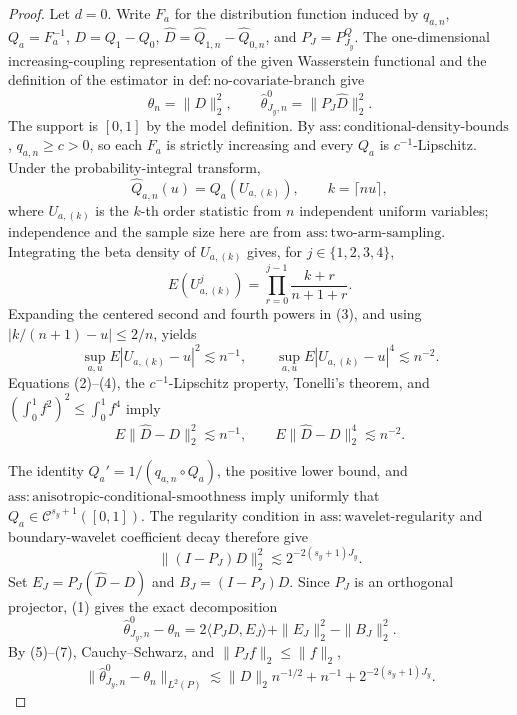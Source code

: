 \documentclass{article}
\begin{document}
\begin{proof}
Let \(d=0\). Write \(F_a\) for the distribution function induced by \(q_{a,n}\), \(Q_a=F_a^{-1}\), \(D=Q_1-Q_0\), \(\widehat D=\widehat Q_{1,n}-\widehat Q_{0,n}\), and \(P_J=P^Q_{J_y}\). The one-dimensional increasing-coupling representation of the given Wasserstein functional and the definition of the estimator in \(\mathrm{def{:}no\text{-}covariate\text{-}branch}\) give
\[
\theta_n=\|D\|_2^2,
\qquad
\widehat\theta^0_{J_y,n}=\|P_J\widehat D\|_2^2. \tag{1}
\]
The support is \([0,1]\) by the model definition. By \(\mathrm{ass{:}conditional\text{-}density\text{-}bounds}\), \(q_{a,n}\ge c>0\), so each \(F_a\) is strictly increasing and every \(Q_a\) is \(c^{-1}\)-Lipschitz. Under the probability-integral transform,
\[
\widehat Q_{a,n}(u)=Q_a(U_{a,(k)}),
\qquad k=\lceil nu\rceil, \tag{2}
\]
where \(U_{a,(k)}\) is the \(k\)-th order statistic from \(n\) independent uniform variables; independence and the sample size here are from \(\mathrm{ass{:}two\text{-}arm\text{-}sampling}\). Integrating the beta density of \(U_{a,(k)}\) gives, for \(j\in\{1,2,3,4\}\),
\[
E(U_{a,(k)}^j)=\prod_{r=0}^{j-1}\frac{k+r}{n+1+r}. \tag{3}
\]
Expanding the centered second and fourth powers in (3), and using \(|k/(n+1)-u|\le2/n\), yields
\[
\sup_{a,u}E|U_{a,(k)}-u|^2\lesssim n^{-1},
\qquad
\sup_{a,u}E|U_{a,(k)}-u|^4\lesssim n^{-2}. \tag{4}
\]
Equations (2)--(4), the \(c^{-1}\)-Lipschitz property, Tonelli's theorem, and \((\int_0^1 f^2)^2\le\int_0^1 f^4\) imply
\[
E\|\widehat D-D\|_2^2\lesssim n^{-1},
\qquad
E\|\widehat D-D\|_2^4\lesssim n^{-2}. \tag{5}
\]

The identity \(Q_a'=1/(q_{a,n}\circ Q_a)\), the positive lower bound, and \(\mathrm{ass{:}anisotropic\text{-}conditional\text{-}smoothness}\) imply uniformly that \(Q_a\in\mathcal C^{s_y+1}([0,1])\). The regularity condition in \(\mathrm{ass{:}wavelet\text{-}regularity}\) and boundary-wavelet coefficient decay therefore give
\[
\|(I-P_J)D\|_2^2\lesssim2^{-2(s_y+1)J_y}. \tag{6}
\]
Set \(E_J=P_J(\widehat D-D)\) and \(B_J=(I-P_J)D\). Since \(P_J\) is an orthogonal projector, (1) gives the exact decomposition
\[
\widehat\theta^0_{J_y,n}-\theta_n
=2\langle P_JD,E_J\rangle+\|E_J\|_2^2-\|B_J\|_2^2. \tag{7}
\]
By (5)--(7), Cauchy--Schwarz, and \(\|P_Jf\|_2\le\|f\|_2\),
\[
\|\widehat\theta^0_{J_y,n}-\theta_n\|_{L^2(P)}
\lesssim\|D\|_2n^{-1/2}+n^{-1}+2^{-2(s_y+1)J_y}. \tag{8}
\]


\end{proof}
\end{document}

